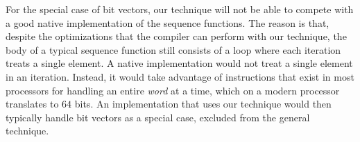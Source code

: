 For the special case of bit vectors, our technique will not be able to
compete with a good native implementation of the sequence functions.
The reason is that, despite the optimizations that the compiler can
perform with our technique, the body of a typical sequence function
still consists of a loop where each iteration treats a single element.
A native implementation would not treat a single element in an
iteration.  Instead, it would take advantage of instructions that
exist in most processors for handling an entire \emph{word} at a time,
which on a modern processor translates to $64$ bits.  An
implementation that uses our technique would then typically handle bit
vectors as a special case, excluded from the general technique.
